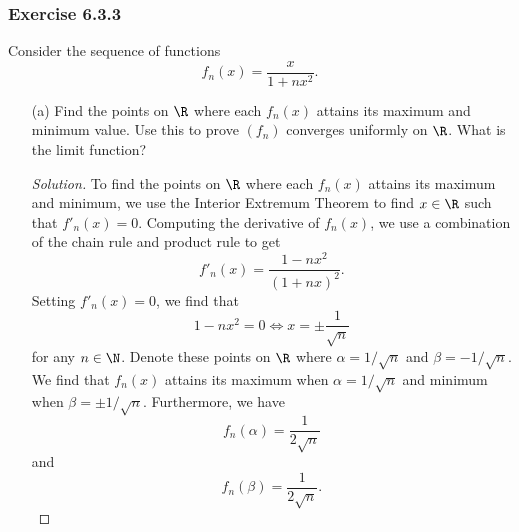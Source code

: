 \subsubsection{Exercise 6.3.3} Consider the sequence of functions
\[  f_n(x) = \frac{ x }{ 1 + nx^2  }. \]
\begin{enumerate}
    \item[(a)] Find the points on \( \R  \) where each \( f_n(x)  \) attains its maximum and minimum value. Use this to prove \( (f_n)  \) converges uniformly on \( \R  \). What is the limit function? 
        \begin{proof}[Solution]
        To find the points on \( \R  \) where each \( f_n(x)  \) attains its maximum and minimum, we use the Interior Extremum Theorem to find \( x \in \R  \) such that \( f'_n(x) = 0   \). Computing the derivative of \( f_n(x)  \), we use a combination of the chain rule and product rule to get
        \[  f'_n(x) = \frac{ 1 - nx^2  }{ (1 +nx)^2 }.  \]
        Setting \( f'_n(x) = 0  \), we find that 
        \[  1 - nx^2 = 0 \iff x = \pm \frac{ 1 }{ \sqrt{ n }  }  \]
        for any \( n \in \N  \). Denote these points on \( \R  \) where \( \alpha = 1 / \sqrt{ n }  \) and \( \beta = -  1 / \sqrt{ n }  \). We find that \( f_n(x)  \) attains its maximum when \( \alpha = 1 / \sqrt{ n  }  \) and minimum when \( \beta = \pm 1 / \sqrt{ n }  \). Furthermore, we have 
        \[  f_n(\alpha) =  \frac{ 1 }{ 2 \sqrt{ n }  }    \]
        and 
        \[  f_n(\beta) = \frac{ 1 }{ 2 \sqrt{ n }  }.  \]


\end{proof}
\end{enumerate}
